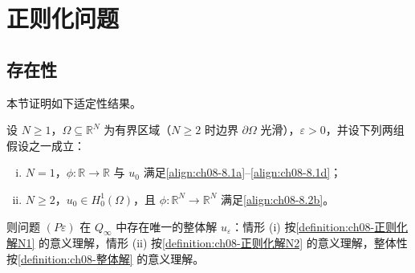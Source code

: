 \documentclass[../../main.tex]{subfiles}%
\begin{document}
\section{正则化问题}\label{section:ch08-正则化问题}

\subsection{存在性}\label{subsection:ch08-存在性}

本节证明如下适定性结果。

\begin{theorem}\label{theorem:ch08-正则化适定}
设 $N\geqslant1$，$\Omega\subseteq\mathbb{R}^N$ 为有界区域（$N\geqslant2$ 时边界 $\partial\Omega$ 光滑），$\varepsilon>0$，并设下列两组假设之一成立：
\begin{enumerate}[(i)]
\item $N=1$，$\phi:\mathbb{R}\to\mathbb{R}$ 与 $u_0$ 满足\eqref{align:ch08-8.1a}--\eqref{align:ch08-8.1d}；
\item $N\geqslant2$，$u_0\in H^1_0(\Omega)$，且 $\phi:\mathbb{R}^N\to\mathbb{R}^N$ 满足\eqref{align:ch08-8.2b}。
\end{enumerate}
则问题 $(P\varepsilon)$ 在 $Q_\infty$ 中存在唯一的整体解 $u_\varepsilon$：情形 (i) 按\cref{definition:ch08-正则化解N1} 的意义理解，情形 (ii) 按\cref{definition:ch08-正则化解N2} 的意义理解，整体性按\cref{definition:ch08-整体解} 的意义理解。
\end{theorem}
\end{document}
